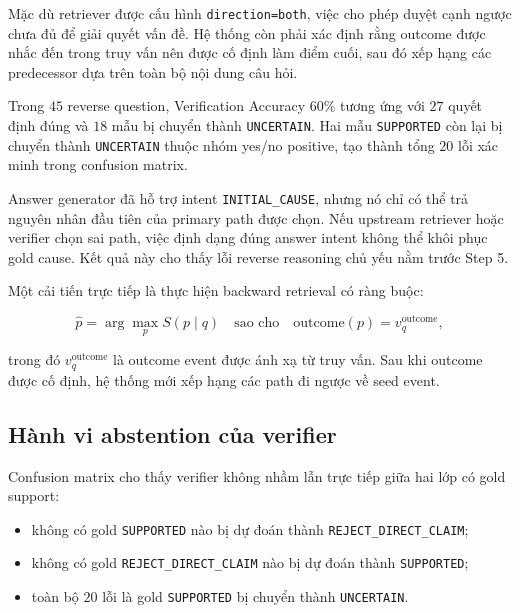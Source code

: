 Mặc dù retriever được cấu hình \texttt{direction=both}, việc cho phép duyệt
cạnh ngược chưa đủ để giải quyết vấn đề. Hệ thống còn phải xác định rằng
outcome được nhắc đến trong truy vấn nên được cố định làm điểm cuối, sau đó
xếp hạng các predecessor dựa trên toàn bộ nội dung câu hỏi.

Trong \(45\) reverse question, Verification Accuracy \(60\%\) tương ứng với
\(27\) quyết định đúng và \(18\) mẫu bị chuyển thành
\texttt{UNCERTAIN}. Hai mẫu \texttt{SUPPORTED} còn lại bị chuyển thành
\texttt{UNCERTAIN} thuộc nhóm yes/no positive, tạo thành tổng \(20\) lỗi xác
minh trong confusion matrix.

Answer generator đã hỗ trợ intent \texttt{INITIAL\_CAUSE}, nhưng nó chỉ có
thể trả nguyên nhân đầu tiên của primary path được chọn. Nếu upstream
retriever hoặc verifier chọn sai path, việc định dạng đúng answer intent
không thể khôi phục gold cause. Kết quả này cho thấy lỗi reverse reasoning
chủ yếu nằm trước Step 5.

Một cải tiến trực tiếp là thực hiện backward retrieval có ràng buộc:

\begin{equation}
\widehat{p}
=
\arg\max_{p}
S(p \mid q)
\quad
\text{sao cho}
\quad
\mathrm{outcome}(p)
=
v_q^{\mathrm{outcome}},
\end{equation}

trong đó \(v_q^{\mathrm{outcome}}\) là outcome event được ánh xạ từ truy vấn.
Sau khi outcome được cố định, hệ thống mới xếp hạng các path đi ngược về seed
event.

\subsection{Hành vi abstention của verifier}

Confusion matrix cho thấy verifier không nhầm lẫn trực tiếp giữa hai lớp có
gold support:

\begin{itemize}
    \item không có gold \texttt{SUPPORTED} nào bị dự đoán thành
    \texttt{REJECT\_DIRECT\_CLAIM};

    \item không có gold \texttt{REJECT\_DIRECT\_CLAIM} nào bị dự đoán thành
    \texttt{SUPPORTED};

    \item toàn bộ \(20\) lỗi là gold \texttt{SUPPORTED} bị chuyển thành
    \texttt{UNCERTAIN}.
\end{itemize}

